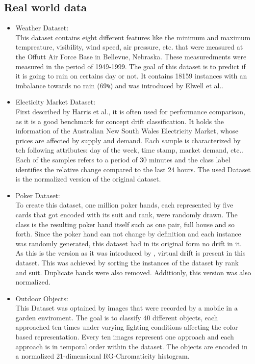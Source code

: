 \documentclass[12pt,oneside,a4paper,parskip]{scrbook}
\begin{document}
\subsection{Real world data}

\begin{itemize}
  \item Weather Dataset: \\
        This dataset contains eight different features like the minimum and maximum tempreature, visibility, wind speed, 
        air pressure, etc. that were measured at the Offutt Air Force Base in Bellevue, Nebraska. These measuredments were
        measured in the period of 1949-1999. The goal of this dataset is to predict if it is going to rain on certains day or not.
        It contains 18159 instances with an imbalance towards no rain (69\verb|%|) and was introduced by Elwell et al..

  \item Electicity Market Dataset:\\
        First described by Harris et al., it is often used for performance comparison, as it is a good benchmark for concept drift 
        classification. It holds the information of the Australian New South Wales Electricity Market, whose prices are affected 
        by supply and demand. Each sample is characterized by teh following attributes: day of the week, time stamp, market demand,
        etc.. Each of the samples refers to a period of 30 minutes and the class label identiﬁes the relative change compared to the
        last 24 hours. The used Dataset is the normalized version of the original dataset.

  \item Poker Dataset: \\
        To create this dataset, one million poker hands, each represented by five cards that got encoded with its suit and rank, 
        were randomly drawn. The class is the resulting poker hand itself such as one pair, full house and so forth.
        Since the poker hand can not change by definition and each instance was randomly generated, this dataset had 
        in its original form no drift in it.
        As this is the version as it was introduced by \cite{bifet2013efficient}, virtual drift is present in this dataset. 
        This was achieved by sorting the instances of the dataset by rank and suit. Duplicate hands were also removed.
        Additionly, this version was also normalized.

  \item Outdoor Objects: \\
        This Dataset was optained by images that were recorded by a mobile in a garden enviroment. The goal is to classify 40 different objects,
        each approached ten times under varying lighting conditions affecting the color based representation.
        Every ten images represent one approach and each approach is in temporal order within the dataset.
        The objects are encoded in a normalized 21-dimensional RG-Chromaticity histogram.

\end{itemize}
\end{document}

